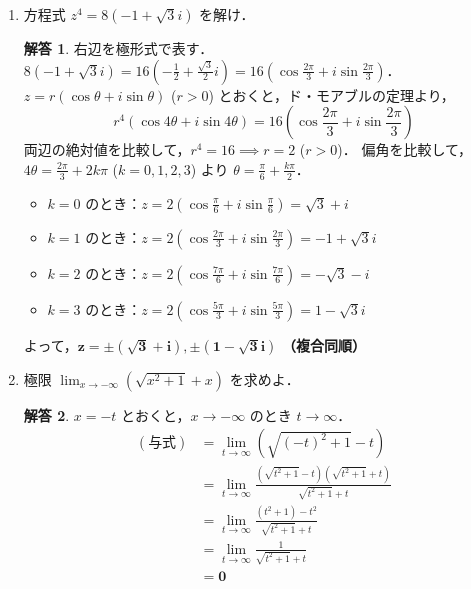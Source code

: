 \documentclass[dvipdfmx]{jlreq}
\theoremstyle{definition}
\newtheorem*{solution}{解答}
\begin{document}
\begin{enumerate}[label=(\arabic*)]
    \item 方程式 $z^4 = 8(-1+\sqrt{3}i)$ を解け．
    \begin{solution}
    右辺を極形式で表す．
    $\displaystyle 8(-1+\sqrt{3}i) = 16\left(-\frac{1}{2} + \frac{\sqrt{3}}{2}i\right) = 16\left(\cos \frac{2\pi}{3} + i\sin \frac{2\pi}{3}\right)$．
    $z = r(\cos \theta + i\sin \theta)$ ($r>0$) とおくと，ド・モアブルの定理より，
    \[ r^4(\cos 4\theta + i\sin 4\theta) = 16\left(\cos \frac{2\pi}{3} + i\sin \frac{2\pi}{3}\right) \]
    両辺の絶対値を比較して，$r^4 = 16 \implies r = 2$ ($r>0$)．
    偏角を比較して，$\displaystyle 4\theta = \frac{2\pi}{3} + 2k\pi$ ($k=0,1,2,3$) より $\displaystyle \theta = \frac{\pi}{6} + \frac{k\pi}{2}$．
    \begin{itemize}
        \item $k=0$ のとき：$\displaystyle z = 2\left(\cos\frac{\pi}{6} + i\sin\frac{\pi}{6}\right) = \sqrt{3} + i$
        \item $k=1$ のとき：$\displaystyle z = 2\left(\cos\frac{2\pi}{3} + i\sin\frac{2\pi}{3}\right) = -1 + \sqrt{3}i$
        \item $k=2$ のとき：$\displaystyle z = 2\left(\cos\frac{7\pi}{6} + i\sin\frac{7\pi}{6}\right) = -\sqrt{3} - i$
        \item $k=3$ のとき：$\displaystyle z = 2\left(\cos\frac{5\pi}{3} + i\sin\frac{5\pi}{3}\right) = 1 - \sqrt{3}i$
    \end{itemize}
    よって，$\bm{z = \pm(\sqrt{3}+i), \pm(1-\sqrt{3}i)}$ \textbf{（複合同順）}
    \end{solution}

\vspace{5mm}

    \item 極限 $\displaystyle \lim_{x\to-\infty} (\sqrt{x^2+1}+x)$ を求めよ．
    \begin{solution}
    $x = -t$ とおくと，$x \to -\infty$ のとき $t \to \infty$．
    \begin{align*}
        (\text{与式}) &= \lim_{t\to\infty} (\sqrt{(-t)^2+1} - t) \\
        &= \lim_{t\to\infty} \frac{(\sqrt{t^2+1}-t)(\sqrt{t^2+1}+t)}{\sqrt{t^2+1}+t} \\
        &= \lim_{t\to\infty} \frac{(t^2+1)-t^2}{\sqrt{t^2+1}+t} \\
        &= \lim_{t\to\infty} \frac{1}{\sqrt{t^2+1}+t} \\
        &= \bm{0}
    \end{align*}
    \end{solution}
\end{enumerate}
\end{document}
